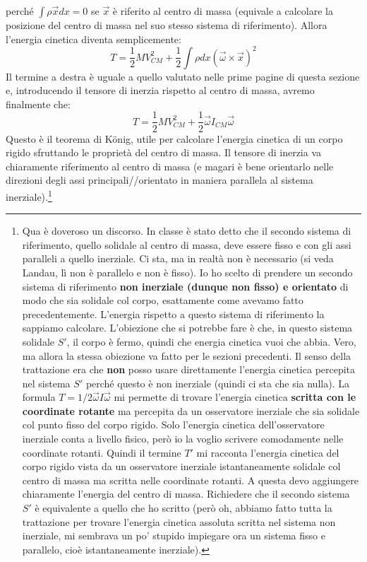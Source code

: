 \documentclass[a4paper,openany]{article}
\begin{document}
	perché $\int \rho\vec{x} dx = 0$ se $\vec{x}$ è riferito al centro di massa (equivale a calcolare la posizione del centro di massa nel suo stesso sistema di riferimento). Allora l'energia cinetica diventa semplicemente:
	$$
	T = \dfrac{1}{2}MV_{CM}^{2} + \dfrac{1}{2}\int \rho dx (\vec\omega \times \vec{x})^{2}
	$$
	Il termine a destra è uguale a quello valutato nelle prime pagine di questa sezione e, introducendo il tensore di inerzia rispetto al centro di massa, avremo finalmente che:
	\begin{equation}\label{key}
		T = \dfrac{1}{2}MV_{CM}^{2} + \dfrac{1}{2}\vec{\omega}I_{CM}\vec\omega
	\end{equation}
	Questo è il teorema di König, utile per calcolare l'energia cinetica di un corpo rigido sfruttando le proprietà del centro di massa. Il tensore di inerzia va chiaramente riferimento al centro di massa (e magari è bene orientarlo nelle direzioni degli assi principali//orientato in maniera parallela al sistema inerziale).\footnote{Qua è doveroso un discorso. In classe è stato detto che il secondo sistema di riferimento, quello solidale al centro di massa, deve essere fisso e con gli assi paralleli a quello inerziale. Ci sta, ma in realtà non è necessario (si veda Landau, lì non è parallelo e non è fisso). Io ho scelto di prendere un secondo sistema di riferimento \textbf{non inerziale (dunque non fisso) e orientato} di modo che sia solidale col corpo, esattamente come avevamo fatto precedentemente. L'energia rispetto a questo sistema di riferimento la sappiamo calcolare. L'obiezione che si potrebbe fare è che, in questo sistema solidale $S'$, il corpo è fermo, quindi che energia cinetica vuoi che abbia. Vero, ma allora la stessa obiezione va fatto per le sezioni precedenti. Il senso della trattazione era che \textbf{non} posso usare direttamente l'energia cinetica percepita nel sistema $S'$ perché questo è non inerziale (quindi ci sta che sia nulla). La formula $T=1/2 \vec{\omega}I\vec\omega$ mi permette di trovare l'energia cinetica \textbf{scritta con le coordinate rotante} ma percepita da un osservatore inerziale che sia solidale col punto fisso del corpo rigido. Solo l'energia cinetica dell'osservatore inerziale conta a livello fisico, però io la voglio scrivere comodamente nelle coordinate rotanti. Quindi il termine $T'$ mi racconta l'energia cinetica del corpo rigido vista da un osservatore inerziale istantaneamente solidale col centro di massa ma scritta nelle coordinate rotanti. A questa devo aggiungere chiaramente l'energia del centro di massa. Richiedere che il secondo sistema $S'$ è equivalente a quello che ho scritto (però oh, abbiamo fatto tutta la trattazione per trovare l'energia cinetica assoluta scritta nel sistema non inerziale, mi sembrava un po' stupido impiegare ora un sistema fisso e parallelo, cioè istantaneamente inerziale).}
\end{document}

